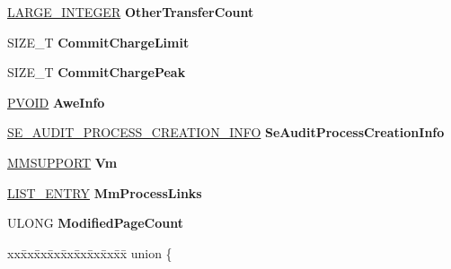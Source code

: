 \begin{DoxyCompactItemize}
\hyperlink{union___l_a_r_g_e___i_n_t_e_g_e_r}{L\+A\+R\+G\+E\+\_\+\+I\+N\+T\+E\+G\+ER} {\bfseries Other\+Transfer\+Count}
\item 
\mbox{\label{struct___e_p_r_o_c_e_s_s_a2b350aead60014067427264aa7522c6a}} 
S\+I\+Z\+E\+\_\+T {\bfseries Commit\+Charge\+Limit}
\item 
\mbox{\label{struct___e_p_r_o_c_e_s_s_a57681b033784325736ae99e901c7f147}} 
S\+I\+Z\+E\+\_\+T {\bfseries Commit\+Charge\+Peak}
\item 
\mbox{\label{struct___e_p_r_o_c_e_s_s_af585df1d6b01e8db7b20e666f9225d60}} 
\hyperlink{interfacevoid}{P\+V\+O\+ID} {\bfseries Awe\+Info}
\item 
\mbox{\label{struct___e_p_r_o_c_e_s_s_aa9652203d9a20619ebd9d4d20f6d93d1}} 
\hyperlink{struct___s_e___a_u_d_i_t___p_r_o_c_e_s_s___c_r_e_a_t_i_o_n___i_n_f_o}{S\+E\+\_\+\+A\+U\+D\+I\+T\+\_\+\+P\+R\+O\+C\+E\+S\+S\+\_\+\+C\+R\+E\+A\+T\+I\+O\+N\+\_\+\+I\+N\+FO} {\bfseries Se\+Audit\+Process\+Creation\+Info}
\item 
\mbox{\label{struct___e_p_r_o_c_e_s_s_a56524c72fb31d176fa0d2e12451aa871}} 
\hyperlink{struct___m_m_s_u_p_p_o_r_t}{M\+M\+S\+U\+P\+P\+O\+RT} {\bfseries Vm}
\item 
\mbox{\label{struct___e_p_r_o_c_e_s_s_a812053dfd7382c9c8b03ffbf1b983141}} 
\hyperlink{struct___l_i_s_t___e_n_t_r_y}{L\+I\+S\+T\+\_\+\+E\+N\+T\+RY} {\bfseries Mm\+Process\+Links}
\item 
\mbox{\label{struct___e_p_r_o_c_e_s_s_aeea71e42f038ed10fd03f2ebae4a44cc}} 
U\+L\+O\+NG {\bfseries Modified\+Page\+Count}
\item 
\mbox{\label{struct___e_p_r_o_c_e_s_s_ad0fac8a80f004d82df470553d2c84099}} 
\begin{tabbing}
xx\=xx\=xx\=xx\=xx\=xx\=xx\=xx\=xx\=\kill
union \{\\
\mbox{\label{union___e_p_r_o_c_e_s_s_1_1_0D2233_a6116b4274ec84d27a5c9ca67daf7d483}} 

\end{tabbing}
\end{DoxyCompactItemize}
